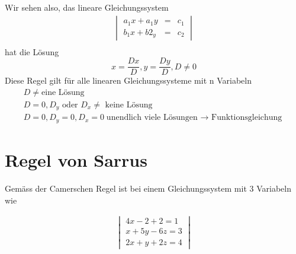 Wir sehen also, das lineare Gleichungssystem
\begin{eqnarray*}
	\begin{vmatrix}a_1x + a_1y &=& c_1\\ 
	b_1x+b2_y &=& c_2\end{vmatrix}\\
\end{eqnarray*}
hat die Lösung 
\begin{equation*}
	x = \frac{Dx}{D}, y = \frac{Dy}{D}, D \not = 0
\end{equation*}
Diese Regel gilt für alle linearen Gleichungssysteme mit n Variabeln
\begin{eqnarray*}
	D \not = \text{eine Lösung}\\
	D = 0, \text{$D_y$ oder $D_x \not = $ keine Lösung}\\
	D = 0, D_y = 0, D_x = 0 \text{unendlich viele Lösungen $\to$ Funktionsgleichung}
\end{eqnarray*}
\newpage
\section{Regel von Sarrus}

Gemäss der Camerschen Regel ist bei einem Gleichungssystem mit 3 Variabeln wie

\begin{eqnarray*}
	\begin{vmatrix}
	4x - 2 + 2 = 1\\
	x + 5y - 6z = 3\\
	2x + y + 2z = 4
	\end{vmatrix}\\
\end{eqnarray*}

